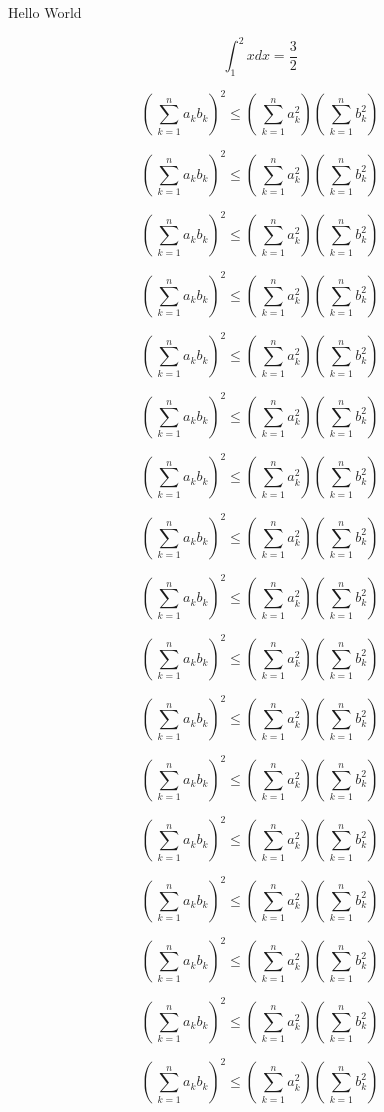 \documentclass{article}
\begin{document}
\newcommand{\mymath}[1]{%
\[#1\]
}

Hello World

\mymath{\int_1^2 xdx = \frac {3}{2}}

\mymath{\left(\, \sum_{k=1}^n a_k b_k \right)^2 \le \left(\, \sum_{k=1}^n a_k^2 \right) \left(\, \sum_{k=1}^n b_k^2 \right)}

\mymath{\left(\, \sum_{k=1}^n a_k b_k \right)^2 \le \left(\, \sum_{k=1}^n a_k^2 \right) \left(\, \sum_{k=1}^n b_k^2 \right)}
\mymath{\left(\, \sum_{k=1}^n a_k b_k \right)^2 \le \left(\, \sum_{k=1}^n a_k^2 \right) \left(\, \sum_{k=1}^n b_k^2 \right)}
\mymath{\left(\, \sum_{k=1}^n a_k b_k \right)^2 \le \left(\, \sum_{k=1}^n a_k^2 \right) \left(\, \sum_{k=1}^n b_k^2 \right)}
\mymath{\left(\, \sum_{k=1}^n a_k b_k \right)^2 \le \left(\, \sum_{k=1}^n a_k^2 \right) \left(\, \sum_{k=1}^n b_k^2 \right)}
\mymath{\left(\, \sum_{k=1}^n a_k b_k \right)^2 \le \left(\, \sum_{k=1}^n a_k^2 \right) \left(\, \sum_{k=1}^n b_k^2 \right)}
\mymath{\left(\, \sum_{k=1}^n a_k b_k \right)^2 \le \left(\, \sum_{k=1}^n a_k^2 \right) \left(\, \sum_{k=1}^n b_k^2 \right)}
\mymath{\left(\, \sum_{k=1}^n a_k b_k \right)^2 \le \left(\, \sum_{k=1}^n a_k^2 \right) \left(\, \sum_{k=1}^n b_k^2 \right)}
\mymath{\left(\, \sum_{k=1}^n a_k b_k \right)^2 \le \left(\, \sum_{k=1}^n a_k^2 \right) \left(\, \sum_{k=1}^n b_k^2 \right)}
\mymath{\left(\, \sum_{k=1}^n a_k b_k \right)^2 \le \left(\, \sum_{k=1}^n a_k^2 \right) \left(\, \sum_{k=1}^n b_k^2 \right)}
\mymath{\left(\, \sum_{k=1}^n a_k b_k \right)^2 \le \left(\, \sum_{k=1}^n a_k^2 \right) \left(\, \sum_{k=1}^n b_k^2 \right)}
\mymath{\left(\, \sum_{k=1}^n a_k b_k \right)^2 \le \left(\, \sum_{k=1}^n a_k^2 \right) \left(\, \sum_{k=1}^n b_k^2 \right)}
\mymath{\left(\, \sum_{k=1}^n a_k b_k \right)^2 \le \left(\, \sum_{k=1}^n a_k^2 \right) \left(\, \sum_{k=1}^n b_k^2 \right)}
\mymath{\left(\, \sum_{k=1}^n a_k b_k \right)^2 \le \left(\, \sum_{k=1}^n a_k^2 \right) \left(\, \sum_{k=1}^n b_k^2 \right)}
\mymath{\left(\, \sum_{k=1}^n a_k b_k \right)^2 \le \left(\, \sum_{k=1}^n a_k^2 \right) \left(\, \sum_{k=1}^n b_k^2 \right)}
\mymath{\left(\, \sum_{k=1}^n a_k b_k \right)^2 \le \left(\, \sum_{k=1}^n a_k^2 \right) \left(\, \sum_{k=1}^n b_k^2 \right)}
\mymath{\left(\, \sum_{k=1}^n a_k b_k \right)^2 \le \left(\, \sum_{k=1}^n a_k^2 \right) \left(\, \sum_{k=1}^n b_k^2 \right)}
\end{document}
